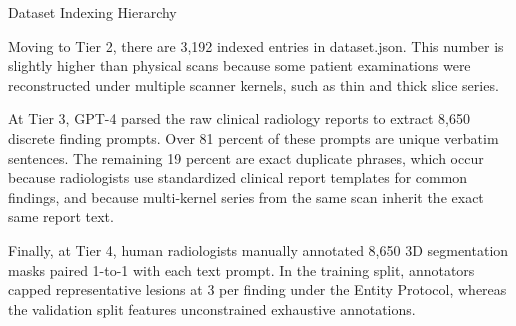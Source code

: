 \documentclass[aspectratio=169, 10pt]{beamer}
\begin{document}
\begin{frame}{Dataset Indexing Hierarchy}
{        Moving to Tier 2, there are 3,192 indexed entries in dataset.json. This number is slightly higher than physical scans because some patient examinations were reconstructed under multiple scanner kernels, such as thin and thick slice series.

        At Tier 3, GPT-4 parsed the raw clinical radiology reports to extract 8,650 discrete finding prompts. Over 81 percent of these prompts are unique verbatim sentences. The remaining 19 percent are exact duplicate phrases, which occur because radiologists use standardized clinical report templates for common findings, and because multi-kernel series from the same scan inherit the exact same report text.

        Finally, at Tier 4, human radiologists manually annotated 8,650 3D segmentation masks paired 1-to-1 with each text prompt. In the training split, annotators capped representative lesions at 3 per finding under the Entity Protocol, whereas the validation split features unconstrained exhaustive annotations.
    }
\end{frame}
\end{document}
